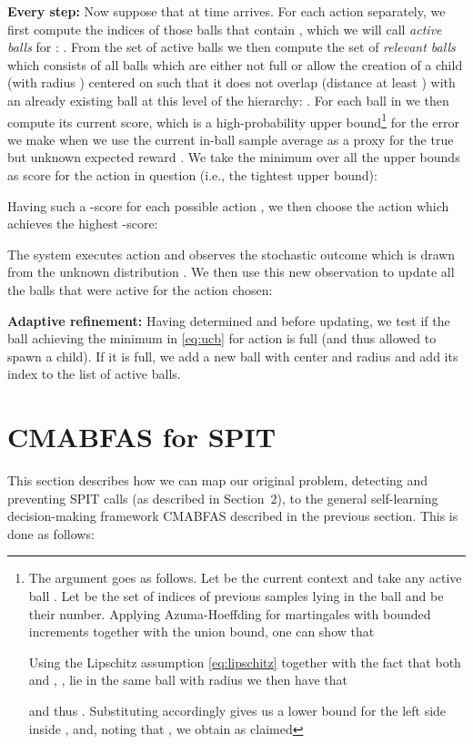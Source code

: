 \documentclass{llncs}
\begin{document}
{\bf \noindent Every step:} Now suppose that at time   arrives. For each action  separately, we first
compute the indices of those balls that contain , which we will call {\em active
balls} for : . From the set of active balls we then 
compute the set of {\em relevant balls} which consists of all balls  which
are either not full or allow the creation of a child (with radius ) centered on 
such that it does not overlap (distance at least ) with an already existing 
ball at this level of the hierarchy: .
For each ball in  we then compute its current score, which is a 
high-probability upper bound\footnote{
The argument 
goes as follows. Let  be the current context and take any active ball .
Let  be the set of indices of previous samples lying in the ball and  be their
number. Applying Azuma-Hoeffding for martingales with bounded increments together with the 
union bound, one can show that
  
Using the Lipschitz assumption \eqref{eq:lipschitz} together with the fact that both  and
, , lie in the same ball  with radius  we then have that

and thus . Substituting  accordingly gives
us a lower bound for the left side inside , and, noting that 
, we obtain
as claimed
}  
for the error we make when we use the current in-ball sample average as a proxy for the true
but unknown expected reward . We take the minimum over all the upper bounds as 
score  for the action in question (i.e., the tightest upper bound):

Having such a -score for each possible action , we then choose the action which
achieves the highest -score:

The system executes action  and observes the stochastic outcome 
which is drawn from the unknown distribution . We then use this
new observation to update all the balls that were active for the action chosen:


{\bf \noindent Adaptive refinement:} Having determined  and before updating, we test if 
the ball  achieving the minimum in \eqref{eq:ucb} for action  is full
(and thus allowed to spawn a child). If it is full, we add a new ball 
with center  and radius  and add its index to the list of active balls.



  
\section{CMABFAS for SPIT}
\label{sec:section5}
This section describes how we can map our original problem, detecting and preventing
SPIT calls (as described in Section~2), to the general self-learning 
decision-making framework CMABFAS described in the previous section. 
This is done as follows:
\end{document}
